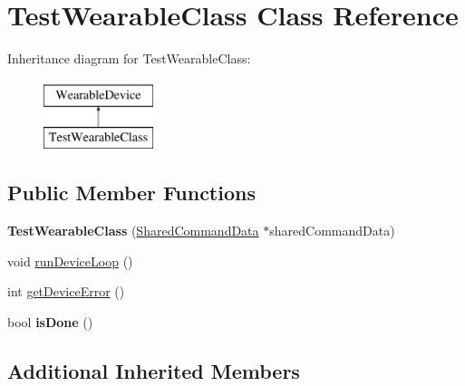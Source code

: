\hypertarget{class_test_wearable_class}{\section{Test\+Wearable\+Class Class Reference}
\label{class_test_wearable_class}
}
Inheritance diagram for Test\+Wearable\+Class\+:\begin{figure}[H]
\begin{center}
\leavevmode
\includegraphics[height=2.000000cm]{class_test_wearable_class}
\end{center}
\end{figure}
\subsection*{Public Member Functions}
\begin{DoxyCompactItemize}
\item 
\hypertarget{class_test_wearable_class_a1d767f72a3732af62ec5a81e564dd4c4}{{\bfseries Test\+Wearable\+Class} (\hyperlink{class_shared_command_data}{Shared\+Command\+Data} $\ast$shared\+Command\+Data)}\label{class_test_wearable_class_a1d767f72a3732af62ec5a81e564dd4c4}

\item 
void \hyperlink{class_test_wearable_class_a77df79994b3f62110d884fd088388858}{run\+Device\+Loop} ()
\item 
int \hyperlink{class_test_wearable_class_ae6ba1ecadd22c18ed4ef7cf119bad740}{get\+Device\+Error} ()
\item 
\hypertarget{class_test_wearable_class_a9a3ab0cac40204faca752a9d59297b59}{bool {\bfseries is\+Done} ()}\label{class_test_wearable_class_a9a3ab0cac40204faca752a9d59297b59}

\end{DoxyCompactItemize}
\subsection*{Additional Inherited Members}


